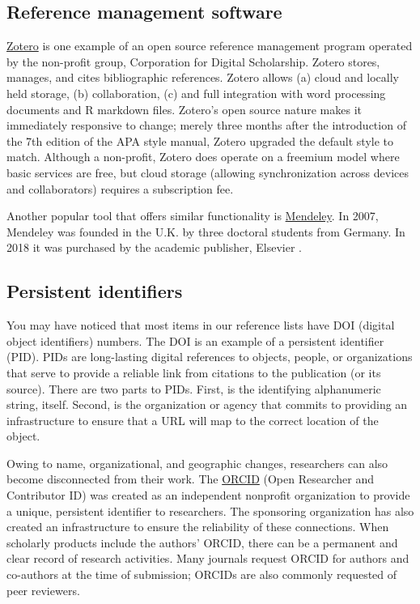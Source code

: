 \documentclass[
  11pt,
]{book}
\begin{document}
\hypertarget{reference-management-software}{%
\subsection{Reference management software}\label{reference-management-software}}

\href{https://www.zotero.org/}{Zotero} \citep{corporation_for_digital_scholarship_zotero_2022} is one example of an open source reference management program operated by the non-profit group, Corporation for Digital Scholarship. Zotero stores, manages, and cites bibliographic references. Zotero allows (a) cloud and locally held storage, (b) collaboration, (c) and full integration with word processing documents and R markdown files. Zotero's open source nature makes it immediately responsive to change; merely three months after the introduction of the 7th edition of the APA style manual, Zotero upgraded the default style to match. Although a non-profit, Zotero does operate on a freemium model where basic services are free, but cloud storage (allowing synchronization across devices and collaborators) requires a subscription fee.

Another popular tool that offers similar functionality is \href{www.mendeley.com}{Mendeley}. In 2007, Mendeley was founded in the U.K. by three doctoral students from Germany. In 2018 it was purchased by the academic publisher, Elsevier \citep{noauthor_mendeley_2022}.

\hypertarget{persistent-identifiers}{%
\subsection{Persistent identifiers}\label{persistent-identifiers}}

You may have noticed that most items in our reference lists have DOI (digital object identifiers) numbers. The DOI is an example of a persistent identifier (PID). PIDs are long-lasting digital references to objects, people, or organizations that serve to provide a reliable link from citations to the publication (or its source). There are two parts to PIDs. First, is the identifying alphanumeric string, itself. Second, is the organization or agency that commits to providing an infrastructure to ensure that a URL will map to the correct location of the object.

Owing to name, organizational, and geographic changes, researchers can also become disconnected from their work. The \href{https://info.orcid.org/}{ORCID} (Open Researcher and Contributor ID) was created as an independent nonprofit organization to provide a unique, persistent identifier to researchers. The sponsoring organization has also created an infrastructure to ensure the reliability of these connections. When scholarly products include the authors' ORCID, there can be a permanent and clear record of research activities. Many journals request ORCID for authors and co-authors at the time of submission; ORCIDs are also commonly requested of peer reviewers.
\end{document}
